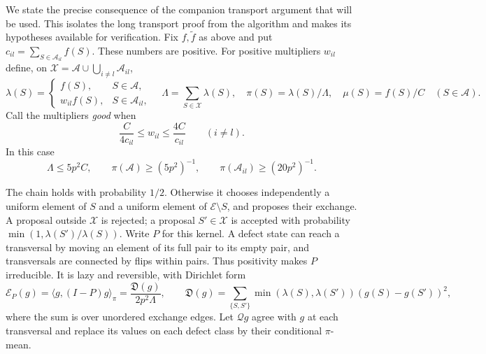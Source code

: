 We state the precise consequence of the companion transport argument
that will be used.  This isolates the long transport proof from the
algorithm and makes its hypotheses available for verification.
Fix $f,\widetilde f$ as above and put
$c_{il}=\sum_{S\in\mathcal A_{il}}f(S)$.  These numbers are positive.
For positive multipliers $w_{il}$ define, on
$\mathcal X=\mathcal A\cup\bigcup_{i\ne l}\mathcal A_{il}$,
\[
 \lambda(S)=
 \begin{cases}f(S),&S\in\mathcal A,\\
               w_{il}f(S),&S\in\mathcal A_{il},\end{cases}
 \quad
 \Lambda=\sum_{S\in\mathcal X}\lambda(S),
 \quad \pi(S)=\lambda(S)/\Lambda,
 \quad \mu(S)=f(S)/C\quad(S\in\mathcal A).
\]
Call the multipliers \emph{good} when
\begin{equation}
 \frac{C}{4c_{il}}\leq w_{il}\leq\frac{4C}{c_{il}}
 \qquad(i\ne l).
 \label{eq:counting-good}
\end{equation}
In this case
\begin{equation}
 \Lambda\leq5p^2C,\qquad
 \pi(\mathcal A)\geq(5p^2)^{-1},\qquad
 \pi(\mathcal A_{il})\geq(20p^2)^{-1}.
 \label{eq:counting-type-mass}
\end{equation}

The chain holds with probability $1/2$.  Otherwise it chooses independently
a uniform element of $S$ and a uniform element of $\mathcal E\setminus S$,
and proposes their exchange.  A proposal outside $\mathcal X$ is rejected;
a proposal $S'\in\mathcal X$ is accepted with probability
$\min(1,\lambda(S')/\lambda(S))$.  Write $P$ for this kernel.  A defect
state can reach a transversal by moving an element of its full pair to
its empty pair, and transversals are connected by flips within pairs.
Thus positivity makes $P$ irreducible.  It is lazy and reversible, with
Dirichlet form
\begin{equation}
 \mathcal E_P(g)=\langle g,(I-P)g\rangle_\pi
   =\frac{\mathfrak D(g)}{2p^2\Lambda},\qquad
 \mathfrak D(g)=\sum_{\{S,S'\}}
      \min(\lambda(S),\lambda(S'))(g(S)-g(S'))^2,
 \label{eq:counting-energy}
\end{equation}
where the sum is over unordered exchange edges.
Let $\mathcal Qg$ agree with $g$ at each transversal and replace its
values on each defect class by their conditional $\pi$-mean.

